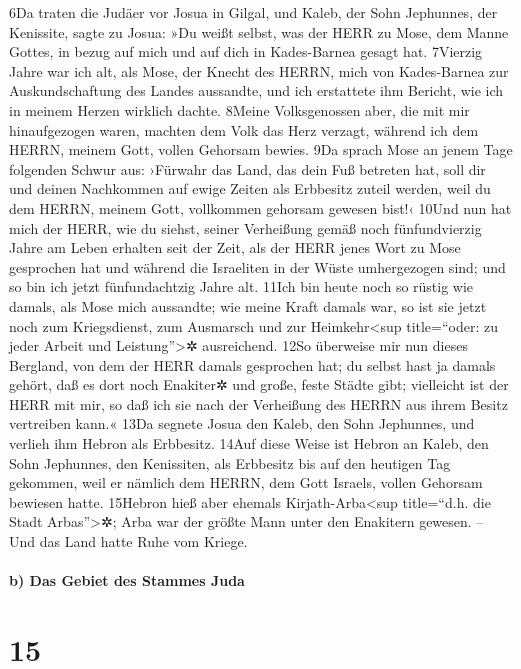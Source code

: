 6Da traten die Judäer vor Josua in Gilgal, und Kaleb, der Sohn
Jephunnes, der Kenissite, sagte zu Josua: »Du weißt selbst, was der HERR
zu Mose, dem Manne Gottes, in bezug auf mich und auf dich in
Kades-Barnea gesagt hat. 7Vierzig Jahre war ich alt, als Mose, der
Knecht des HERRN, mich von Kades-Barnea zur Auskundschaftung des Landes
aussandte, und ich erstattete ihm Bericht, wie ich in meinem Herzen
wirklich dachte. 8Meine Volksgenossen aber, die mit mir hinaufgezogen
waren, machten dem Volk das Herz verzagt, während ich dem HERRN, meinem
Gott, vollen Gehorsam bewies. 9Da sprach Mose an jenem Tage folgenden
Schwur aus: ›Fürwahr das Land, das dein Fuß betreten hat, soll dir und
deinen Nachkommen auf ewige Zeiten als Erbbesitz zuteil werden, weil du
dem HERRN, meinem Gott, vollkommen gehorsam gewesen bist!‹ 10Und nun hat
mich der HERR, wie du siehst, seiner Verheißung gemäß noch
fünfundvierzig Jahre am Leben erhalten seit der Zeit, als der HERR jenes
Wort zu Mose gesprochen hat und während die Israeliten in der Wüste
umhergezogen sind; und so bin ich jetzt fünfundachtzig Jahre alt. 11Ich
bin heute noch so rüstig wie damals, als Mose mich aussandte; wie meine
Kraft damals war, so ist sie jetzt noch zum Kriegsdienst, zum Ausmarsch
und zur Heimkehr\textless sup title=``oder: zu jeder Arbeit und
Leistung''\textgreater✲ ausreichend. 12So überweise mir nun dieses
Bergland, von dem der HERR damals gesprochen hat; du selbst hast ja
damals gehört, daß es dort noch Enakiter✲ und große, feste Städte gibt;
vielleicht ist der HERR mit mir, so daß ich sie nach der Verheißung des
HERRN aus ihrem Besitz vertreiben kann.« 13Da segnete Josua den Kaleb,
den Sohn Jephunnes, und verlieh ihm Hebron als Erbbesitz. 14Auf diese
Weise ist Hebron an Kaleb, den Sohn Jephunnes, den Kenissiten, als
Erbbesitz bis auf den heutigen Tag gekommen, weil er nämlich dem HERRN,
dem Gott Israels, vollen Gehorsam bewiesen hatte. 15Hebron hieß aber
ehemals Kirjath-Arba\textless sup title=``d.h. die Stadt
Arbas''\textgreater✲; Arba war der größte Mann unter den Enakitern
gewesen. -- Und das Land hatte Ruhe vom Kriege.

\hypertarget{b-das-gebiet-des-stammes-juda}{%
\paragraph{b) Das Gebiet des Stammes
Juda}\label{b-das-gebiet-des-stammes-juda}}

\hypertarget{section-14}{%
\section{15}\label{section-14}}

